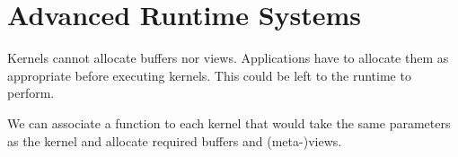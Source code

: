 \chapter{Advanced Runtime Systems}

Kernels cannot allocate buffers nor views. Applications have to allocate
them as appropriate before executing kernels. This could be left to the runtime
to perform.

We can associate a function to each kernel that would take the same parameters
as the kernel and allocate required buffers and (meta-)views.
